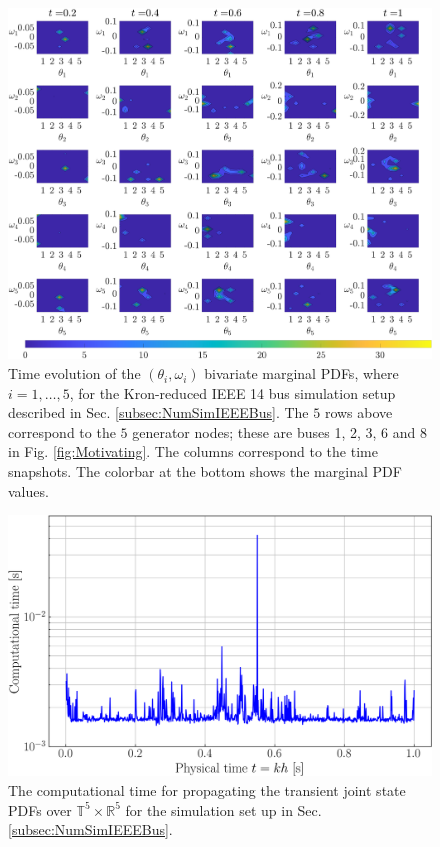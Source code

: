 \documentclass[10pt,twocolumn]{IEEEtran}
\begin{document}
\begin{figure}[t]
\centering
\includegraphics[width=0.9\linewidth]{IEEE14marginals.png}
\caption{\small{Time evolution of the $(\theta_{i},\omega_{i})$ bivariate marginal PDFs, where $i=1,\hdots,5$, for the Kron-reduced IEEE 14 bus simulation setup described in Sec. \ref{subsec:NumSimIEEEBus}. The $5$ rows above correspond to the $5$ generator nodes; these are buses 1, 2, 3, 6 and 8 in Fig. \ref{fig:Motivating}. The columns correspond to the time snapshots. The colorbar at the bottom shows the marginal PDF values.}}
\vspace*{-0.1in}
\label{fig:IEEE14marginals}
\end{figure}

\begin{figure}[t]
\centering
\includegraphics[width=0.95\linewidth]{ComputationalTimeSyntheticIEEE14bus.png}
\caption{\small{The computational time for propagating the transient joint state PDFs over $\mathbb{T}^{5}\times\mathbb{R}^{5}$ for the simulation set up in Sec. \ref{subsec:NumSimIEEEBus}.}}
\vspace*{-0.1in}
\label{fig:CompTimeIEEE14bus}
\end{figure}
\end{document}
